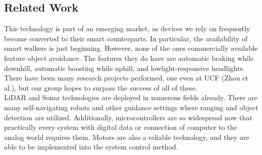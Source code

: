 \subsection{Related Work}
\indent This technology is part of an emerging market, as devices we rely on frequently become converted to their smart counterparts. In particular, the availability of smart walkers is just beginning. However, none of the ones commercially available feature object avoidance. The features they do have are automatic braking while downhill, automatic boosting while uphill, and lowlight-responsive headlights. There have been many research projects performed, one even at UCF (Zhou et al.), but our group hopes to surpass the success of all of these.
\\


\noindent LiDAR and Sonar technologies are deployed in numerous fields already. There are many self-navigating robots and other guidance settings where ranging and object detection are utilized. Additionally, microcontrollers are so widespread now that practically every system with digital data or connection of computer to the analog world requires them. Motors are also a reliable technology, and they are able to be implemented into the system control method.

